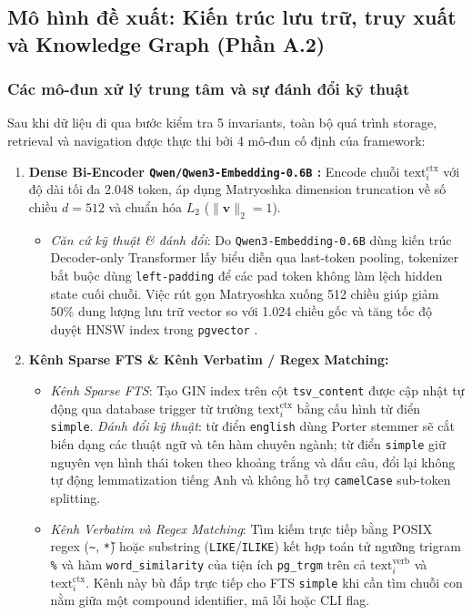 \subsection{Mô hình đề xuất: Kiến trúc lưu trữ, truy xuất và Knowledge Graph (Phần A.2)}

\subsubsection{Các mô-đun xử lý trung tâm và sự đánh đổi kỹ thuật}
Sau khi dữ liệu đi qua bước kiểm tra 5 invariants, toàn bộ quá trình storage, retrieval và navigation được thực thi bởi 4 mô-đun cố định của framework:

\begin{enumerate}
    \item \textbf{Dense Bi-Encoder \texttt{Qwen/Qwen3-Embedding-0.6B} \cite{zhang2025qwen3}:} Encode chuỗi $\text{text}^{\text{ctx}}_i$ với độ dài tối đa 2.048 token, áp dụng Matryoshka dimension truncation \cite{kusupati2022mrl} về số chiều $d = 512$ và chuẩn hóa $L_2$ ($\|\mathbf{v}\|_2 = 1$).
    \begin{itemize}
        \item \textit{Căn cứ kỹ thuật \& đánh đổi}: Do \texttt{Qwen3-Embedding-0.6B} dùng kiến trúc Decoder-only Transformer lấy biểu diễn qua last-token pooling, tokenizer bắt buộc dùng \texttt{left-padding} để các pad token không làm lệch hidden state cuối chuỗi. Việc rút gọn Matryoshka xuống 512 chiều giúp giảm 50\% dung lượng lưu trữ vector so với 1.024 chiều gốc và tăng tốc độ duyệt HNSW index trong \texttt{pgvector} \cite{zhang2025qwen3, kusupati2022mrl}.
    \end{itemize}
    \item \textbf{Kênh Sparse FTS \& Kênh Verbatim / Regex Matching:}
    \begin{itemize}
        \item \textit{Kênh Sparse FTS}: Tạo GIN index trên cột \texttt{tsv\_content} được cập nhật tự động qua database trigger từ trường $\text{text}^{\text{ctx}}_i$ bằng cấu hình từ điển \texttt{simple}. \textit{Đánh đổi kỹ thuật}: từ điển \texttt{english} dùng Porter stemmer sẽ cắt biến dạng các thuật ngữ và tên hàm chuyên ngành; từ điển \texttt{simple} giữ nguyên vẹn hình thái token theo khoảng trắng và dấu câu, đổi lại không tự động lemmatization tiếng Anh và không hỗ trợ \texttt{camelCase} sub-token splitting.
        \item \textit{Kênh Verbatim và Regex Matching}: Tìm kiếm trực tiếp bằng POSIX regex (\texttt{\~}, \texttt{\~*}) hoặc substring (\texttt{LIKE}/\texttt{ILIKE}) kết hợp toán tử ngưỡng trigram \texttt{\%} và hàm \texttt{word\_similarity} của tiện ích \texttt{pg\_trgm} trên cả $\text{text}^{\text{verb}}_i$ và $\text{text}^{\text{ctx}}_i$. Kênh này bù đắp trực tiếp cho FTS \texttt{simple} khi cần tìm chuỗi con nằm giữa một compound identifier, mã lỗi hoặc CLI flag.

\end{itemize}
\end{enumerate}
